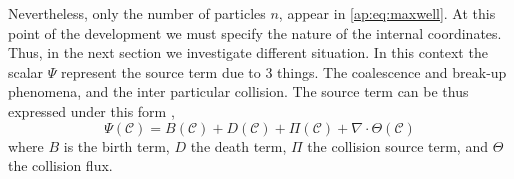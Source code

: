Nevertheless, only the number of particles  $n$, appear in \ref{ap:eq:maxwell}.
At this point of the development we must specify the nature of the internal coordinates.
Thus, in the next section we investigate different situation. 
In this context the scalar $\Psi$ represent the source term due to 3 things. 
The coalescence and break-up phenomena, and the inter particular collision. 
The source term can be thus expressed under this form \citep{rao2008introduction,curtiss1956kinetic},  
\begin{equation*}
    \Psi(\mathscr{C}) = B(\mathscr{C}) + D(\mathscr{C}) + \Pi(\mathscr{C}) + \nabla \cdot \Theta(\mathscr{C})
\end{equation*}
where $B$ is the birth term, $D$ the death term, $\Pi$ the collision source term, and $\Theta$ the collision flux. 

